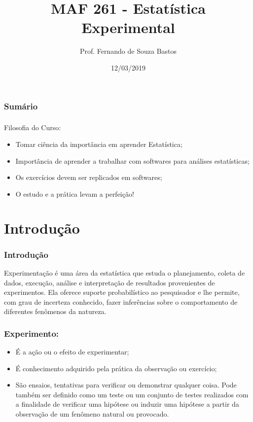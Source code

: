 \documentclass[14pt,aspectratio=1610]{beamer}
\title{MAF 261 - Estatística Experimental}
\author{Prof. Fernando de Souza Bastos}
\institute{Instituto de Ciências Exatas e Tecnológicas\texorpdfstring{\\ Universidade Federal de Viçosa}{}\texorpdfstring{\\ Campus UFV - Florestal}{}}
\date{12/03/2019}
\begin{document}
\frame{\titlepage}

\begin{frame}{}
\frametitle{\bf Sumário}
\tableofcontents
\end{frame}


\begin{frame}{}
\frametitle{}

\begin{block}{Filosofia do Curso:}
\begin{itemize}
    \item Tomar ciência da importância em aprender Estatística;\pause
    \item Importância de aprender a trabalhar com softwares para análises estatísticas;\pause
    \item Os exercícios devem ser replicados em softwares;\pause
    \item O estudo e a prática levam a perfeição!
\end{itemize}
\end{block}
\end{frame}
\section{Introdução}
\begin{frame}{}
\frametitle{Introdução}
\begin{block}{}
\justifying
Experimentação é uma área da estatística que estuda o planejamento, coleta de dados, execução, análise e interpretação de resultados provenientes de experimentos. 
Ela oferece suporte probabilístico ao pesquisador e lhe permite, com grau de incerteza conhecido, fazer inferências sobre o comportamento de diferentes fenômenos 
da natureza.
\end{block}
\end{frame}

\begin{frame}{}
\frametitle{Experimento:}
\begin{block}{}
\justifying
\begin{itemize}
\item É a ação ou o efeito de experimentar; \pause
\item É conhecimento adquirido pela prática da observação ou exercício; \pause
\item São ensaios, tentativas para verificar ou demonstrar qualquer coisa. Pode também ser definido como um teste ou um conjunto de testes realizados com a finalidade 
de verificar uma hipótese ou induzir uma hipótese a partir da observação de um fenômeno natural ou provocado. 
\end{itemize}
\end{block}
\end{frame}
\end{document}
